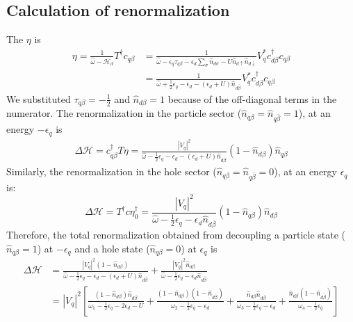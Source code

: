\documentclass[twoside]{report}
\numberwithin{equation}{section}
\begin{document}
\subsection{Calculation of renormalization}
The \(\eta\) is
\begin{equation}\begin{aligned}
	\eta = \frac{1}{\hat \omega - \mathcal{H}_d}T^\dagger c_{q\beta} &= \frac{1}{\hat \omega - \epsilon_q \tau_{q\beta} - \epsilon_{d}\sum_\sigma  \hat n_{d\sigma} -  U \hat n_{d\uparrow} \hat n_{d\downarrow}}V_q^* c^\dagger_{d\beta}c_{q\beta}\\
							     &= \frac{1}{\hat \omega + \frac{1}{2}\epsilon_q - \epsilon_d - \left(\epsilon_d + U \right)\hat n_{d\overline\beta}}V_q^* c^\dagger_{d\beta}c_{q\beta}
\end{aligned}\end{equation}
We substituted \(\tau_{q\beta} = -\frac{1}{2}\) and \(\hat n_{d\beta} = 1\) because of the off-diagonal terms in the numerator.
The renormalization in the particle sector (\(\hat n_{q\beta} = \hat n_{q\overline\beta} = 1\)), at an energy \(-\epsilon_q\) is
\begin{equation}\begin{aligned}
\Delta \mathcal{H} = c^\dagger_{q\beta} T \eta= \frac{|V_q|^2}{\hat \omega - \frac{1}{2}\epsilon_q - \epsilon_d - \left(\epsilon_d + U \right)\hat n_{d\overline\beta}} \left(1 - \hat n_{d\beta}\right)\hat n_{q\beta} 
\end{aligned}\end{equation}
Similarly, the renormalization in the hole sector (\(\hat n_{q\beta} = \hat n_{q\overline\beta} = 0\)), at an energy \(\epsilon_q\) is:
\begin{equation}
	\Delta \mathcal{H} = T^\dagger c \eta_0^\dagger = \frac{|V_q|^2}{\hat \omega - \frac{1}{2}\epsilon_q - \epsilon_d\hat n_{d\overline\beta}}\left(1 - \hat n_{q\beta}\right)\hat n_{d\beta}
\end{equation}
Therefore, the total renormalization obtained from decoupling a particle state (\(\hat n_{q\beta}=1\)) at \(-\epsilon_q\) and a hole state (\(\hat n_{q\beta}=0\)) at \(\epsilon_q\) is
\begin{equation}\begin{aligned}
	\Delta \mathcal{H} &= \frac{|V_q|^2 \left(1 - \hat n_{d\beta}\right)}{\hat \omega - \frac{1}{2}\epsilon_q - \epsilon_d - \left(\epsilon_d + U \right)\hat n_{d\overline\beta}} + \frac{|V_q|^2\hat n_{d\beta}}{\hat \omega - \frac{1}{2}\epsilon_q - \epsilon_d \hat n_{d\overline\beta}}\\
		    &=|V_q|^2 \left[\frac{\left(1 - \hat n_{d\beta}\right)\hat n_{d\overline\beta}}{\omega_1 - \frac{1}{2}\epsilon_q - 2\epsilon_d - U} + \frac{\left(1 - \hat n_{d\beta}\right)\left( 1-\hat n_{d\overline\beta} \right)}{\omega_2 - \frac{1}{2}\epsilon_q - \epsilon_d} + \frac{\hat n_{d\beta} \hat n_{d\overline\beta}}{\omega_3 - \frac{1}{2}\epsilon_q - \epsilon_d} + \frac{\hat n_{d\beta}\left( 1- \hat n_{d\overline\beta}\right) }{\omega_4 - \frac{1}{2}\epsilon_q}\right]\\
\end{aligned}\end{equation}
\end{document}
